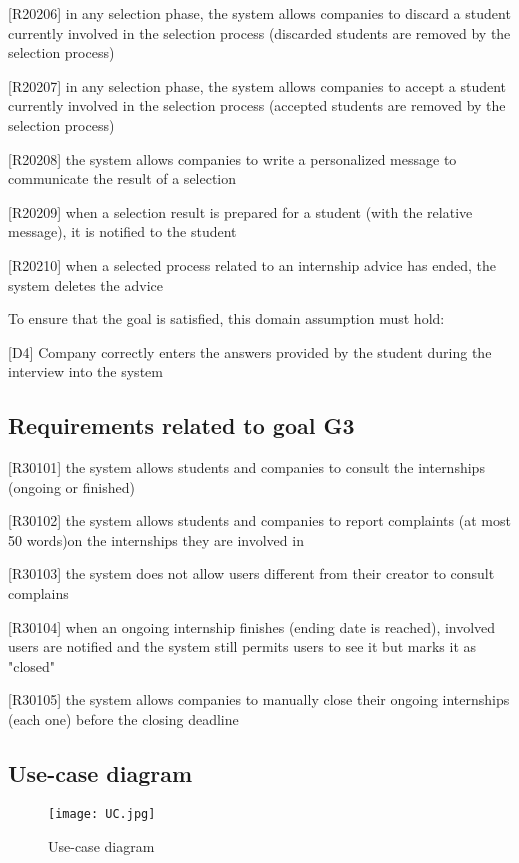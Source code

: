 		[R20206] in any selection phase, the system allows companies to discard a student currently involved in the selection process (discarded students are removed by the selection process)
		
		[R20207] in any selection phase, the system allows companies to accept a student currently involved in the selection process (accepted students are removed by the selection process)
		
		[R20208] the system allows companies to write a personalized message to communicate the result of a selection
		
		[R20209] when a selection result is prepared for a student (with the relative message), it is notified to the student
		
		[R20210] when a selected process related to an internship advice has ended, the system deletes the advice
		
		To ensure that the goal is satisfied, this domain assumption must hold:
		
		
		[D4] Company correctly enters the answers provided by the student during the interview into the system
		
		\subsection{Requirements related to goal G3}
		
		[R30101] the system allows students and companies to consult the internships (ongoing or finished)
		
		[R30102] the system allows students and companies to report complaints (at most 50 words)on the internships they are involved in
		
		[R30103] the system does not allow users different from their creator to consult complains
		
		[R30104] when an ongoing internship finishes (ending date is reached), involved users are notified and the system still permits users to see it but marks it as "closed"
		
		[R30105] the system allows companies to manually close their ongoing internships (each one) before the closing deadline
		
		\subsection{Use-case diagram}
			
			\begin{figure}[H]
				\centering
				\texttt{[image: UC.jpg]}
				\caption{Use-case diagram}
			\end{figure}
			
